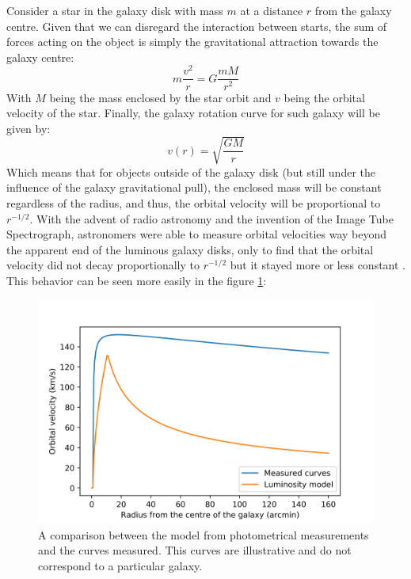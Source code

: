 Consider a star in the galaxy disk with mass $m$ at a distance $r$ from the galaxy centre. Given that we can disregard the interaction between starts, the sum of forces acting on the object is simply the gravitational attraction towards the galaxy centre:
\begin{equation}
\label{heh}
m\frac{v^2}{r} = G \frac{mM}{r^2}
\end{equation}%
With $M$ being the mass enclosed by the star orbit and $v$ being the orbital velocity of the star. Finally, the galaxy rotation curve for such galaxy will be given by:
\begin{equation}
v(r) = \sqrt{\frac{GM}{r}}
\end{equation}%
Which means that for objects outside of the galaxy disk (but still under the influence of the galaxy gravitational pull), the enclosed mass will be constant regardless of the radius, and thus, the orbital velocity will be proportional to $r^{-1/2}$. With the advent of radio astronomy and the invention of the Image Tube Spectrograph, astronomers were able to measure orbital velocities way beyond the apparent end of the luminous galaxy disks, only to find that the orbital velocity did not decay proportionally to $r^{-1/2}$ but it stayed more or less constant\cite{h21Line} \cite{galactoDistance} \cite{veraFirst}. This behavior can be seen more easily in the figure \ref{galaxyCurve}:%
\begin{figure}[ht]
    \centering
    \includegraphics[scale=0.8]{imag/galaxyRotCurv.png}
    \caption{A comparison between the model from photometrical measurements and the curves measured. This curves are illustrative and do not correspond to a particular galaxy.}
    \label{galaxyCurve}
\end{figure}

